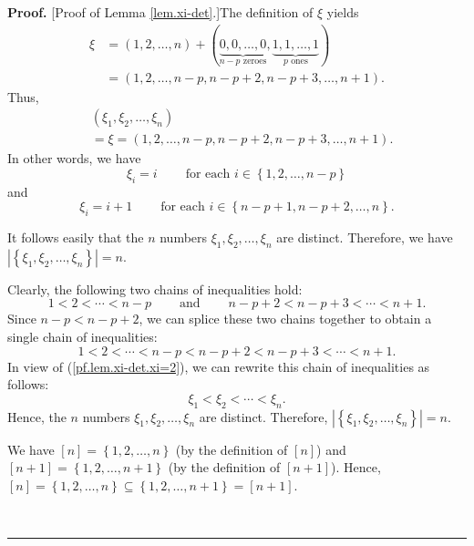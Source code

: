 \documentclass
[numbers=enddot,12pt,final,onecolumn,notitlepage,english]{scrartcl}%
\theoremstyle{definition}
\newenvironment{proof}[1][Proof]{\noindent\textbf{#1.} }{\ \rule{0.5em}{0.5em}}
\newenvironment{verlong}{}{}
\newenvironment{vershort}{}{}
\begin{document}
\begin{proof}
[Proof of Lemma \ref{lem.xi-det}.]The definition of $\xi$ yields%
\begin{align*}
\xi &  =\left(  1,2,\ldots,n\right)  +\left(  \underbrace{0,0,\ldots
,0}_{n-p\text{ zeroes}},\underbrace{1,1,\ldots,1}_{p\text{ ones}}\right) \\
&  =\left(  1,2,\ldots,n-p,n-p+2,n-p+3,\ldots,n+1\right)  .
\end{align*}
Thus,%
\begin{align}
&  \left(  \xi_{1},\xi_{2},\ldots,\xi_{n}\right) \nonumber\\
&  =\xi=\left(  1,2,\ldots,n-p,n-p+2,n-p+3,\ldots,n+1\right)  .
\label{pf.lem.xi-det.xi=2}%
\end{align}
In other words, we have%
\begin{equation}
\xi_{i}=i\ \ \ \ \ \ \ \ \ \ \text{for each }i\in\left\{  1,2,\ldots
,n-p\right\}  \label{pf.lem.xi-det.xii=}%
\end{equation}
and%
\begin{equation}
\xi_{i}=i+1\ \ \ \ \ \ \ \ \ \ \text{for each }i\in\left\{  n-p+1,n-p+2,\ldots
,n\right\}  . \label{pf.lem.xi-det.xin=}%
\end{equation}


\begin{vershort}
\noindent It follows easily that the $n$ numbers $\xi_{1},\xi_{2},\ldots
,\xi_{n}$ are distinct. Therefore, we have $\left\vert \left\{  \xi_{1}%
,\xi_{2},\ldots,\xi_{n}\right\}  \right\vert =n$.
\end{vershort}

\begin{verlong}
Clearly, the following two chains of inequalities hold:%
\[
1<2<\cdots<n-p\ \ \ \ \ \ \ \ \ \ \text{and}%
\ \ \ \ \ \ \ \ \ \ n-p+2<n-p+3<\cdots<n+1.
\]
Since $n-p<n-p+2$, we can splice these two chains together to obtain a single
chain of inequalities:%
\[
1<2<\cdots<n-p<n-p+2<n-p+3<\cdots<n+1.
\]
In view of (\ref{pf.lem.xi-det.xi=2}), we can rewrite this chain of
inequalities as follows:
\[
\xi_{1}<\xi_{2}<\cdots<\xi_{n}.
\]
Hence, the $n$ numbers $\xi_{1},\xi_{2},\ldots,\xi_{n}$ are distinct.
Therefore, $\left\vert \left\{  \xi_{1},\xi_{2},\ldots,\xi_{n}\right\}
\right\vert =n$.
\end{verlong}

\begin{verlong}
We have $\left[  n\right]  =\left\{  1,2,\ldots,n\right\}  $ (by the
definition of $\left[  n\right]  $) and $\left[  n+1\right]  =\left\{
1,2,\ldots,n+1\right\}  $ (by the definition of $\left[  n+1\right]  $).
Hence, $\left[  n\right]  =\left\{  1,2,\ldots,n\right\}  \subseteq\left\{
1,2,\ldots,n+1\right\}  =\left[  n+1\right]  $.\medskip
\end{verlong}


\end{proof}
\end{document}
